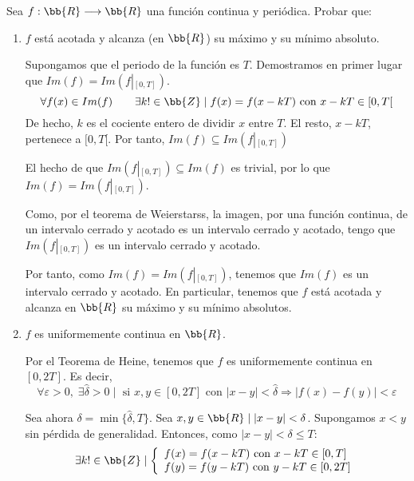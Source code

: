 \begin{ejercicio}
    Sea $f:\bb{R}\longrightarrow \bb{R}$ una función continua y periódica. Probar que:
    \begin{enumerate}
        \item $f$ está acotada y alcanza (en $\bb{R}$) su máximo y su mínimo absoluto.

        Supongamos que el periodo de la función es $T$. Demostramos en primer lugar que $Im(f) = Im(f\left|_{[0,T]} \right.)$.
        \begin{equation*}
            \forall f(x) \in  Im(f) \qquad \exists k!\in \bb{Z} \mid f(x)=f(x-kT)\text{ con }x-kT\in [0,T[
        \end{equation*}
        De hecho, $k$ es el cociente entero de dividir $x$ entre $T$. El resto, $x-kT$, pertenece a $[0,T[$. Por tanto, $Im(f) \subseteq Im(f\left|_{[0,T]} \right.)$

        El hecho de que $Im(f\left|_{[0,T]} \right.) \subseteq Im(f)$ es trivial, por lo que $Im(f) = Im(f\left|_{[0,T]} \right.)$.

        Como, por el teorema de Weierstarss, la imagen, por una función continua, de un intervalo cerrado y acotado es un intervalo cerrado y acotado, tengo que $Im(f\left|_{[0,T]} \right.)$ es un intervalo cerrado y acotado.

        Por tanto, como $Im(f) = Im(f\left|_{[0,T]} \right.)$, tenemos que $Im(f)$ es un intervalo cerrado y acotado. En particular, tenemos que $f$ está acotada y alcanza en $\bb{R}$ su máximo y su mínimo absolutos.
        
        \item $f$ es uniformemente continua en $\bb{R}$.

        Por el Teorema de Heine, tenemos que $f$ es uniformemente continua en $[0,2T]$. Es decir,
        \begin{equation*}
            \forall {\varepsilon}>0,\;\exists \hat{\delta}>0 \mid  \text{ si }x,y\in [0,2T] \text{ con } |x-y|<\hat{\delta} \Longrightarrow |f(x)-f(y)| < {\varepsilon}
        \end{equation*}

        Sea ahora $\delta = \min \{\hat{\delta}, T\}$. Sea $x,y\in \bb{R} \mid |x-y|<\delta$. Supongamos $x<y$ sin pérdida de generalidad. Entonces, como $|x-y| < \delta \leq T$:
        \begin{equation*}
            \exists k! \in \bb{Z} \mid \left\{ \begin{array}{l}
                f(x)=f(x-kT) \text{ con }x-kT\in [0,T]  \\
                f(y)=f(y-kT) \text{ con }y-kT\in [0,2T]
            \end{array} \right.
        \end{equation*}


\end{enumerate}
\end{ejercicio}
